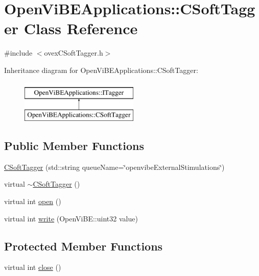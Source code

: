 \hypertarget{classOpenViBEApplications_1_1CSoftTagger}{
\section{OpenViBEApplications::CSoftTagger Class Reference}
\label{classOpenViBEApplications_1_1CSoftTagger}
}


{\ttfamily \#include $<$ovexCSoftTagger.h$>$}

Inheritance diagram for OpenViBEApplications::CSoftTagger:\begin{figure}[H]
\begin{center}
\leavevmode
\includegraphics[height=2.000000cm]{classOpenViBEApplications_1_1CSoftTagger}
\end{center}
\end{figure}
\subsection*{Public Member Functions}
\begin{DoxyCompactItemize}
\item 
\hyperlink{classOpenViBEApplications_1_1CSoftTagger_a72a02e6ee1dbcdc7eaa4c9f463ab2ab0}{CSoftTagger} (std::string queueName=\char`\"{}openvibeExternalStimulations\char`\"{})
\item 
virtual \hyperlink{classOpenViBEApplications_1_1CSoftTagger_a472109314f2637786cd305cc61ebe4a5}{$\sim$CSoftTagger} ()
\item 
virtual int \hyperlink{classOpenViBEApplications_1_1CSoftTagger_a64bd7fa740f00445dd984803f3194a15}{open} ()
\item 
virtual int \hyperlink{classOpenViBEApplications_1_1CSoftTagger_a8cc4b6a6b5fb0cd00ecd07dd0f955120}{write} (OpenViBE::uint32 value)
\end{DoxyCompactItemize}
\subsection*{Protected Member Functions}
\begin{DoxyCompactItemize}
\item 
virtual int \hyperlink{classOpenViBEApplications_1_1CSoftTagger_a0cf05bebd1bb99269681c8a5ef0e8e14}{close} ()
\end{DoxyCompactItemize}
